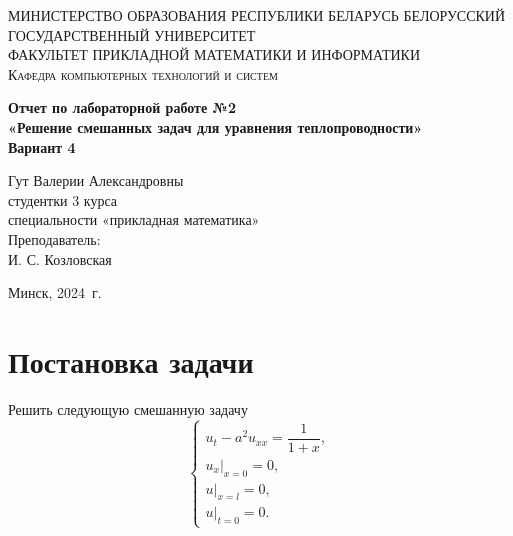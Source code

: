 \documentclass[a4paper, 12pt]{report}
\begin{document}
	\begin{titlepage}
		\begin{center}
			\textsc{МИНИСТЕРСТВО ОБРАЗОВАНИЯ РЕСПУБЛИКИ БЕЛАРУСЬ БЕЛОРУССКИЙ ГОСУДАРСТВЕННЫЙ УНИВЕРСИТЕТ
				\\[5mm]
				ФАКУЛЬТЕТ ПРИКЛАДНОЙ МАТЕМАТИКИ И ИНФОРМАТИКИ\\[2mm]
				Кафедра компьютерных технологий и систем
			}
			
			\vfill
			
			\textbf{Отчет по лабораторной работе №2\\
				«Решение смешанных задач для уравнения теплопроводности»\\
				Вариант 4
				\\[26mm]
			}
		\end{center}
		
		\hfill
		\begin{minipage}{.5\textwidth}
			\begin{flushright}
				Гут Валерии Александровны\\
				студентки 3 курса\\
				специальности «прикладная математика»\\[5mm]
				
				Преподаватель:\\[2mm] 
				И. С. Козловская\\
			\end{flushright}
		\end{minipage}%
		\vfill
		\begin{center}
			Минск, 2024\ г.
		\end{center}
	\end{titlepage}
	\newpage
	\section*{Постановка задачи}
	Решить следующую смешанную задачу 
	\begin{equation}
		\begin{cases}
		u_t - a^2 u_{xx} = \dfrac{1}{1+x},\\
		u_x|_{x=0} = 0,\\
		u|_{x=l} = 0,\\
		u|_{t=0} = 0.
	\end{cases}
	\end{equation}
\end{document}
